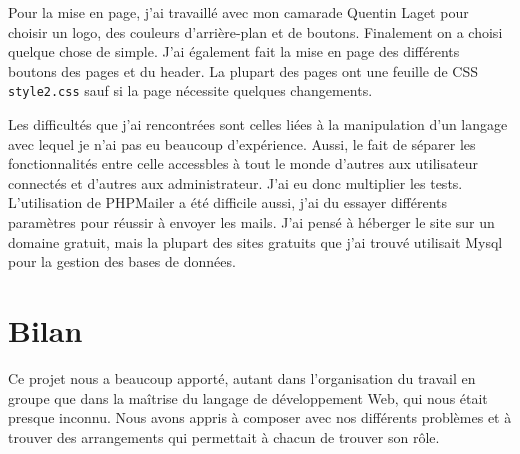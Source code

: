 \documentclass{article}
\begin{document}
Pour la mise en page, j'ai travaillé avec mon camarade Quentin Laget pour choisir un logo, des couleurs d'arrière-plan et de boutons. Finalement on a choisi quelque chose de simple. J'ai également fait la mise en page des différents boutons des pages et du header. La plupart des pages ont une feuille de CSS \texttt{style2.css} sauf si la page nécessite quelques changements.

Les difficultés que j'ai rencontrées sont celles liées à la manipulation d'un langage avec lequel je n'ai pas eu beaucoup d'expérience. Aussi, le fait de séparer les fonctionnalités entre celle accessbles à tout le monde d'autres aux utilisateur connectés et d'autres aux administrateur. J'ai eu donc multiplier les tests. L'utilisation de PHPMailer a été difficile aussi, j'ai du essayer différents paramètres pour réussir à envoyer les mails. J'ai pensé à héberger le site sur un domaine gratuit, mais la plupart des sites gratuits que j'ai trouvé utilisait Mysql pour la gestion des bases de données.


\section*{Bilan}

Ce projet nous a beaucoup apporté, autant dans l'organisation du travail en groupe que dans la maîtrise du langage de développement Web, qui nous était presque inconnu. Nous avons appris à composer avec nos différents problèmes et à trouver des arrangements qui permettait à chacun de trouver son rôle.
\end{document}
